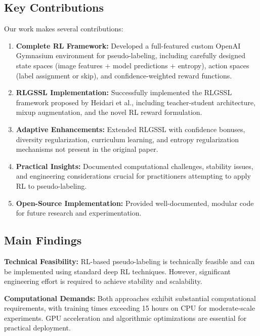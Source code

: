 \documentclass{scrartcl}
\begin{document}
\subsection{Key Contributions}

Our work makes several contributions:

\begin{enumerate}
    \item \textbf{Complete RL Framework:} Developed a full-featured custom OpenAI Gymnasium environment for pseudo-labeling, including carefully designed state spaces (image features + model predictions + entropy), action spaces (label assignment or skip), and confidence-weighted reward functions.
    
    \item \textbf{RLGSSL Implementation:} Successfully implemented the RLGSSL framework proposed by Heidari et al., including teacher-student architecture, mixup augmentation, and the novel RL reward formulation.
    
    \item \textbf{Adaptive Enhancements:} Extended RLGSSL with confidence bonuses, diversity regularization, curriculum learning, and entropy regularization mechanisms not present in the original paper.
    
    \item \textbf{Practical Insights:} Documented computational challenges, stability issues, and engineering considerations crucial for practitioners attempting to apply RL to pseudo-labeling.
    
    \item \textbf{Open-Source Implementation:} Provided well-documented, modular code for future research and experimentation.
\end{enumerate}

\subsection{Main Findings}

\textbf{Technical Feasibility:} RL-based pseudo-labeling is technically feasible and can be implemented using standard deep RL techniques. However, significant engineering effort is required to achieve stability and scalability.

\textbf{Computational Demands:} Both approaches exhibit substantial computational requirements, with training times exceeding 15 hours on CPU for moderate-scale experiments. GPU acceleration and algorithmic optimizations are essential for practical deployment.
\end{document}
